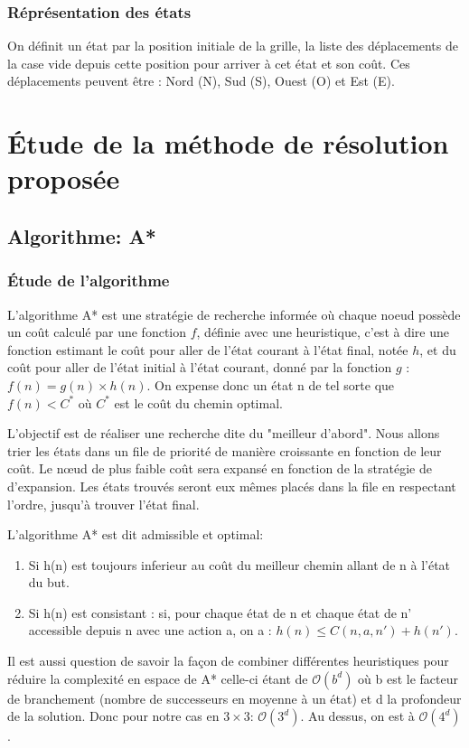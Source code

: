 \documentclass[a4paper, 12pt]{article}
\begin{document}
\subsubsection{Réprésentation des états}
On définit un état par la position initiale de la grille, la liste des déplacements de la case vide depuis cette position pour arriver à cet état et son coût. Ces déplacements peuvent être : Nord (N), Sud (S), Ouest (O) et Est (E).

\section{Étude de la méthode de résolution proposée}

\subsection{Algorithme: A*}

\subsubsection{Étude de l'algorithme}

L'algorithme A* est une stratégie de recherche informée où chaque noeud possède un coût calculé par une fonction $f$, définie avec une heuristique, c'est à dire une fonction estimant le coût pour aller de l'état courant à l'état final, notée $h$, et du coût pour aller de l'état initial à l'état courant, donné par la fonction $g$ : $ f(n) = g(n) \times h(n)$. On expense donc un état n de tel sorte que $f(n)<C^*$  où $C^*$ est le coût du chemin optimal.

L'objectif est de réaliser une recherche dite du "meilleur d'abord". Nous allons trier les états dans un file de priorité de manière croissante en fonction de leur coût. Le n\oe ud de plus faible coût sera expansé en fonction de la stratégie de d'expansion.
Les états trouvés seront eux mêmes placés dans la file en respectant l'ordre, jusqu'à trouver l'état final.

L'algorithme A* est dit admissible et optimal:
\begin{enumerate}
    \item Si h(n) est toujours inferieur au coût du meilleur chemin allant de n à l'état du but.
    \item Si h(n) est consistant : si, pour chaque état de n et chaque état de n' accessible depuis n avec une action a, on a : $h(n) \leq C(n,a,n')+h(n')$.
\end{enumerate}
Il est aussi question de savoir la façon de combiner différentes heuristiques pour réduire la complexité en espace de A* celle-ci étant de $\mathcal{O}(b^{d})$ où b est le facteur de branchement (nombre de successeurs en moyenne à un état) et d la profondeur de la solution.
Donc pour notre cas en $3 \times 3$: $\mathcal{O}(3^{d})$. Au dessus, on est à $\mathcal{O}(4^{d})$.
\end{document}
